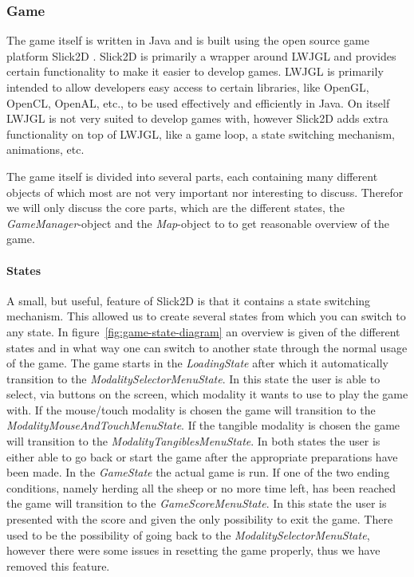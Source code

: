 \documentclass[a4paper,10pt]{article}
\begin{document}
		\subsubsection{Game}
		The game itself is written in Java and is built using the open source game platform Slick2D \cite{Slick2D}.
		Slick2D is primarily a wrapper around LWJGL \cite{LWJGL} and provides certain functionality to make it easier to develop games.
		LWJGL is primarily intended to allow developers easy access to certain libraries, like OpenGL, OpenCL, OpenAL, etc., to be used effectively and efficiently in Java.
		On itself LWJGL is not very suited to develop games with, however Slick2D adds extra functionality on top of LWJGL, like a game loop, a state switching mechanism, animations, etc.
		
		The game itself is divided into several parts, each containing many different objects of which most are not very important nor interesting to discuss.
		Therefor we will only discuss the core parts, which are the different states, the \emph{GameManager}-object and the \emph{Map}-object to to get reasonable overview of the game.
		
		\paragraph{States}
		A small, but useful, feature of Slick2D is that it contains a state switching mechanism.
		This allowed us to create several states from which you can switch to any state.
		In figure~\ref{fig:game-state-diagram} an overview is given of the different states and in what way one can switch to another state through the normal usage of the game.
		The game starts in the \emph{LoadingState} after which it automatically transition to the \emph{ModalitySelectorMenuState}.
		In this state the user is able to select, via buttons on the screen, which modality it wants to use to play the game with.
		If the mouse/touch modality is chosen the game will transition to the \emph{ModalityMouseAndTouchMenuState}.
		If the tangible modality is chosen the game will transition to the \emph{ModalityTangiblesMenuState}.
		In both states the user is either able to go back or start the game after the appropriate preparations have been made.
		In the \emph{GameState} the actual game is run.
		If one of the two ending conditions, namely herding all the sheep or no more time left, has been reached the game will transition to the \emph{GameScoreMenuState}.
		In this state the user is presented with the score and given the only possibility to exit the game.
		There used to be the possibility of going back to the \emph{ModalitySelectorMenuState}, however there were some issues in resetting the game properly, thus we have removed this feature.
		
\end{document}
